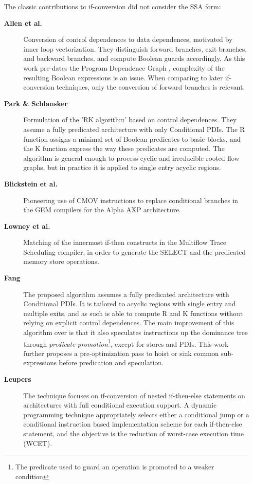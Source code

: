 \medskip
The classic contributions to if-conversion
did not consider the SSA form: \begin{description}

\item[\textbf{Allen et al. \cite{Allen:1983:POPL}}] Conversion of control
dependences to data dependences, motivated by inner loop vectorization. They
distinguish forward branches, exit branches, and backward branches, and compute
Boolean guards accordingly. As this work pre-dates the Program Dependence Graph
\cite{Ferrante:1987:TOPLAS}, complexity of the resulting Boolean expressions is
an issue. When comparing to later if-conversion techniques, only the conversion
of forward branches is relevant.

\item[\textbf{Park \& Schlansker \cite{Park:1991:TR58}}] Formulation of the 'RK
algorithm' based on control dependences. They assume a fully predicated
architecture with only Conditional PDIs. The R function assigns a minimal set of
Boolean predicates to basic blocks, and the K function express the way these
predicates are computed.  The algorithm is general enough to process cyclic and
irreducible rooted flow graphs, but in practice it is applied to single entry
acyclic regions.

\item[\textbf{Blickstein et al. \cite{Blickstein:1992:DTJ}}] Pioneering use of CMOV
instructions to replace conditional branches in the GEM compilers for the Alpha
AXP architecture.

\item[\textbf{Lowney et al. \cite{Lowney:1993:JS}}] Matching of the innermost if-then
constructs in the Multiflow Trace Scheduling compiler, in order to generate the
SELECT and the predicated memory store operations.

\item[\textbf{Fang \cite{Fang:1996:LCPC}}] The proposed algorithm assumes a
fully predicated architecture with Conditional PDIs. It is tailored to acyclic
regions with single entry and multiple exits, and as such is able to compute R
and K functions without relying on explicit control dependences.  The main
improvement of this algorithm over \cite{Park:1991:TR58} is that it also
speculates instructions up the dominance tree through \emph{predicate
promotion}\footnote{The predicate used to guard an operation is promoted to a
weaker condition},
except for stores and PDIs. This work further proposes a pre-optimization pass
to hoist or sink common sub-expressions before predication and speculation.

\item[\textbf{Leupers \cite{Leupers:1999:DATE}}] The technique focuses on
if-conversion of nested if-then-else statements on architectures with full
conditional execution support. A dynamic programming technique appropriately
selects either a conditional jump or a conditional instruction based
implementation scheme for each if-then-else statement, and the objective is the
reduction of worst-case execution time (WCET).

\end{description}

